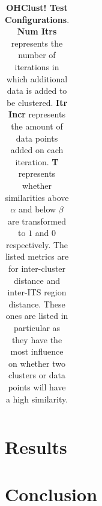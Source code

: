 \documentclass[12pt]{ucthesis}
\begin{document}
\begin{table}[t]
{\begin{tabular} {| c | c | c | c | c | c | c | c | c |}
      \hline
      \end{tabular}
      }
      \caption{\textbf{OHClust! Test Configurations}. \textbf{Num Itrs}
               represents the number of iterations in which additional data is
               added to be clustered. \textbf{Itr Incr} represents the amount
               of data points added on each iteration. \textbf{T} represents
               whether similarities above $\alpha$ and below $\beta$ are
               transformed to $1$ and $0$ respectively. The listed metrics are
               for inter-cluster distance and inter-ITS region distance. These
               ones are listed in particular as they have the most influence on
               whether two clusters or data points will have a high similarity.}
      \label{tab:ohclust_configs}
      \end{table}


   \section{Results}\label{sec:results}

   \section{Conclusion}\label{sec:conclusion}



\clearpage


\end{document}
